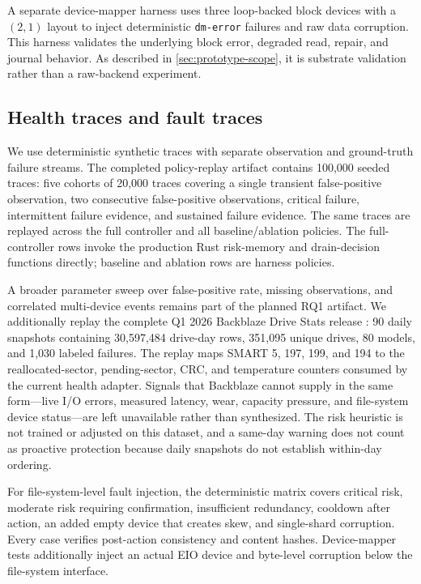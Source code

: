 A separate device-mapper harness uses three loop-backed block devices with a $(2,1)$ layout to inject deterministic \texttt{dm-error} failures and raw data corruption. This harness validates the underlying block error, degraded read, repair, and journal behavior. As described in \cref{sec:prototype-scope}, it is substrate validation rather than a raw-backend \autopilot{} experiment.

\subsection{Health traces and fault traces}
We use deterministic synthetic traces with separate observation and ground-truth failure streams. The completed policy-replay artifact contains 100,000 seeded traces: five cohorts of 20,000 traces covering a single transient false-positive observation, two consecutive false-positive observations, critical failure, intermittent failure evidence, and sustained failure evidence. The same traces are replayed across the full controller and all baseline/ablation policies. The full-controller rows invoke the production Rust risk-memory and drain-decision functions directly; baseline and ablation rows are harness policies.

A broader parameter sweep over false-positive rate, missing observations, and correlated multi-device events remains part of the planned RQ1 artifact. We additionally replay the complete Q1 2026 Backblaze Drive Stats release \citep{backblaze2026q1}: 90 daily snapshots containing 30,597,484 drive-day rows, 351,095 unique drives, 80 models, and 1,030 labeled failures. The replay maps SMART 5, 197, 199, and 194 to the reallocated-sector, pending-sector, CRC, and temperature counters consumed by the current \argosfs{} health adapter. Signals that Backblaze cannot supply in the same form---live I/O errors, measured latency, wear, capacity pressure, and file-system device status---are left unavailable rather than synthesized. The risk heuristic is not trained or adjusted on this dataset, and a same-day warning does not count as proactive protection because daily snapshots do not establish within-day ordering.

For file-system-level fault injection, the deterministic matrix covers critical risk, moderate risk requiring confirmation, insufficient redundancy, cooldown after action, an added empty device that creates skew, and single-shard corruption. Every case verifies post-action consistency and content hashes. Device-mapper tests additionally inject an actual EIO device and byte-level corruption below the file-system interface.

